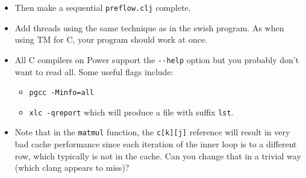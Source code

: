 \documentclass{forsete}
\begin{document}
\begin{itemize}
\item Then make a sequential \verb!preflow.clj! complete.
\item Add threads using the same technique as in the swish program. As when using TM for C, your  program should work at once.
\item All C compilers on Power support the \verb!--help! option but you probably don't want to read all. 
Some useful flags include:
\begin{itemize}
\item \verb.pgcc -Minfo=all.
\item \verb.xlc -qreport. which will produce a file with suffix \verb.lst..
\end{itemize}
\item Note that in the \verb!matmul! function, the \verb!c[k][j]! reference will result in very 
bad cache performance since each iteration of the inner loop is to a different row, which typically is not
in the cache. Can you change that in a trivial way (which clang appears to miss)?
\end{itemize}
\end{document}
